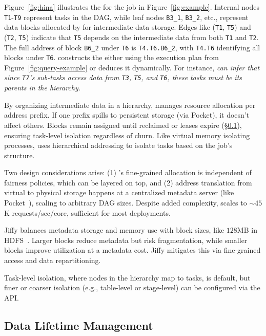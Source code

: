  Figure~\ref{fig:hina} illustrates the \lh for the job in Figure~\ref{fig:example}. Internal nodes \texttt{T1}-\texttt{T9} represent tasks in the DAG, while leaf nodes \texttt{B3\_1}, \texttt{B3\_2}, etc., represent data blocks allocated by \jiffy for intermediate data storage. Edges like (\texttt{T1}, \texttt{T5}) and (\texttt{T2}, \texttt{T5}) indicate that \texttt{T5} depends on the intermediate data from both \texttt{T1} and \texttt{T2}. The full address of block \texttt{B6\_2} under \texttt{T6} is \texttt{T4.T6.B6\_2}, with \texttt{T4.T6} identifying all blocks under \texttt{T6}. \jiffy constructs the \lh either using the execution plan from Figure~\ref{fig:query-example} or deduces it dynamically. For instance, \sl can infer that since \texttt{T7}'s sub-tasks access data from \texttt{T3}, \texttt{T5}, and \texttt{T6}, these tasks must be its parents in the hierarchy.


By organizing intermediate data in a hierarchy, \jiffy manages resource allocation per address prefix. If one prefix spills to persistent storage (via Pocket), it doesn’t affect others. Blocks remain assigned until reclaimed or leases expire (\S\ref{ssec:mlm}), ensuring task-level isolation regardless of churn. Like virtual memory isolating processes, \jiffy uses hierarchical addressing to isolate tasks based on the job's structure.

Two design considerations arise: (1) \jiffy's fine-grained allocation is independent of fairness policies, which can be layered on top, and (2) address translation from virtual to physical storage happens at a centralized metadata server (like Pocket~\cite{pocket}), scaling to arbitrary DAG sizes. Despite added complexity, \jiffy scales to ${\sim}45$K requests/sec/core, sufficient for most deployments.

 Jiffy balances metadata storage and memory use with block sizes, like $128$MB in HDFS~\cite{hdfs}. Larger blocks reduce metadata but risk fragmentation, while smaller blocks improve utilization at a metadata cost. Jiffy mitigates this via fine-grained access and data repartitioning.

 Task-level isolation, where nodes in the hierarchy map to tasks, is default, but finer or coarser isolation (e.g., table-level or stage-level) can be configured via the \jiffy API.


\subsection{Data Lifetime Management}
\label{ssec:mlm}

